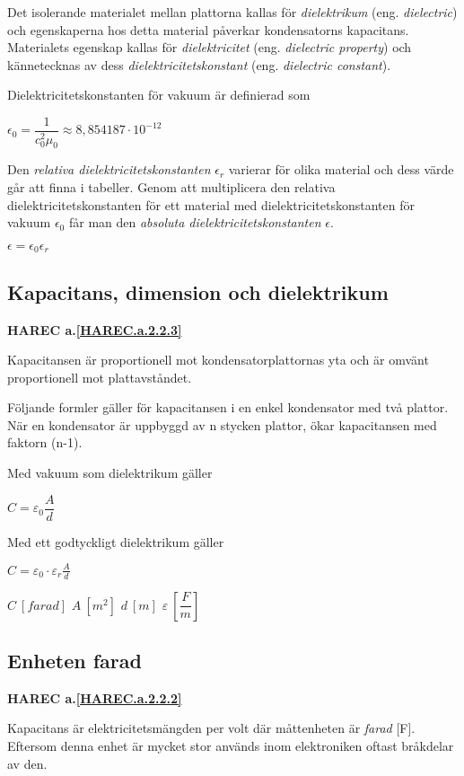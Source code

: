 Det isolerande materialet mellan plattorna kallas för \emph{dielektrikum}
(eng. \emph{dielectric}) och egenskaperna hos detta material påverkar
kondensatorns kapacitans.
Materialets egenskap kallas för \emph{dielektricitet}
(eng. \emph{dielectric property}) och kännetecknas av dess
\emph{dielektricitetskonstant} (eng. \emph{dielectric constant}).

Dielektricitetskonstanten för vakuum är definierad som

\(\epsilon_0 = \dfrac{1}{c_0^2\mu_0} \approx 8,854187 \cdot 10^{-12}\)

Den \emph{relativa dielektricitetskonstanten} \(\epsilon_r\) varierar för olika material och dess värde 
går att finna i tabeller. Genom att multiplicera den relativa dielektricitetskonstanten 
för ett material med dielektricitetskonstanten för vakuum \(\epsilon_0\) får man den
\emph{absoluta dielektricitetskonstanten} \(\epsilon\).

\(\epsilon = \epsilon_0\epsilon_r\)


\subsection{Kapacitans, dimension och dielektrikum}
\textbf{HAREC a.\ref{HAREC.a.2.2.3}\label{myHAREC.a.2.2.3}}

Kapacitansen är proportionell mot kondensatorplattornas yta och är omvänt 
proportionell mot plattavståndet.

Följande formler gäller för kapacitansen i en enkel kondensator med två
plattor. När en kondensator är uppbyggd av n stycken plattor, ökar kapacitansen
med faktorn (n-1).

Med vakuum som dielektrikum gäller

\(C = \varepsilon _0 \dfrac{A}{d}\)

Med ett godtyckligt dielektrikum gäller

\(C = \varepsilon _0 \cdot \varepsilon _r \frac{A}{d}\)

\(C\ [farad]\) \(A\ [m^2]\) \(d\ [m]\) \(\varepsilon\ [\dfrac{F}{m}]\)

\subsection{Enheten farad}
\textbf{HAREC a.\ref{HAREC.a.2.2.2}\label{myHAREC.a.2.2.2}}

Kapacitans är elektricitetsmängden per volt där måttenheten är \emph{farad} [F].
Eftersom denna enhet är mycket stor används inom elektroniken oftast bråkdelar
av den.

